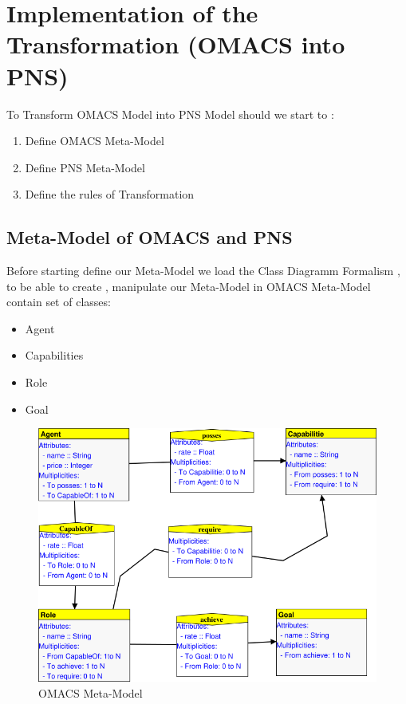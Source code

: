  

\section{Implementation of the Transformation (OMACS into PNS)\label{sec:OMACS into PNS} }%
To Transform OMACS Model into PNS Model should we start to :
\begin{enumerate}
\item Define OMACS Meta-Model 
\item Define PNS Meta-Model
\item Define the rules of Transformation
\end{enumerate}


\subsection{ Meta-Model of OMACS  and PNS } 
Before starting define our Meta-Model we load the Class Diagramm Formalism , to be able to create , manipulate our Meta-Model
in OMACS Meta-Model contain set of classes:

\begin{itemize}

\item Agent  
\item Capabilities
\item Role
\item Goal

\end{itemize}
 
\begin{figure}[th]
		\centering
 	\includegraphics[scale=0.7]{Chapiter3/img/omacs_meta}
	\caption{\label{fig:OMACS Meta-Model}OMACS Meta-Model}
\end{figure} 
 

